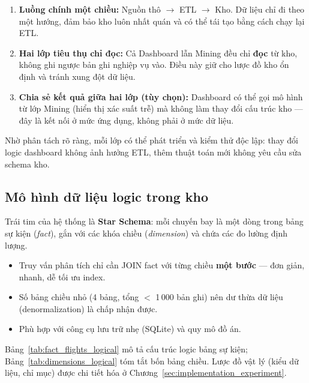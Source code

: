 \begin{enumerate}
    \item \textbf{Luồng chính một chiều:}
          Nguồn thô $\rightarrow$ ETL $\rightarrow$ Kho.
          Dữ liệu chỉ đi theo một hướng, đảm bảo kho luôn nhất quán
          và có thể tái tạo bằng cách chạy lại ETL.

    \item \textbf{Hai lớp tiêu thụ chỉ đọc:}
          Cả Dashboard lẫn Mining đều chỉ \textbf{đọc} từ kho,
          không ghi ngược bản ghi nghiệp vụ vào.
          Điều này giữ cho lược đồ kho ổn định và tránh xung đột dữ liệu.

    \item \textbf{Chia sẻ kết quả giữa hai lớp (tùy chọn):}
          Dashboard có thể gọi mô hình từ lớp Mining (hiển thị xác suất trễ)
          mà không làm thay đổi cấu trúc kho --- đây là kết nối ở mức ứng dụng,
          không phải ở mức dữ liệu.
\end{enumerate}

Nhờ phân tách rõ ràng, mỗi lớp có thể phát triển và kiểm thử độc lập:
thay đổi logic dashboard không ảnh hưởng ETL,
thêm thuật toán mới không yêu cầu sửa schema kho.

\subsection{Mô hình dữ liệu logic trong kho}

Trái tim của hệ thống là \textbf{Star Schema}:
mỗi chuyến bay là một dòng trong bảng sự kiện (\textit{fact}),
gắn với các khóa chiều (\textit{dimension}) và chứa các đo lường định lượng.

\begin{itemize}
    \item Truy vấn phân tích chỉ cần JOIN fact với từng chiều \textbf{một bước}
          --- đơn giản, nhanh, dễ tối ưu index.
    \item Số bảng chiều nhỏ (4 bảng, tổng $<$ 1\,000 bản ghi)
          nên dư thừa dữ liệu (denormalization) là chấp nhận được.
    \item Phù hợp với công cụ lưu trữ nhẹ (SQLite) và quy mô đồ án.
\end{itemize}

Bảng~\ref{tab:fact_flights_logical} mô tả cấu trúc logic bảng sự kiện;
Bảng~\ref{tab:dimensions_logical} tóm tắt bốn bảng chiều.
Lược đồ vật lý (kiểu dữ liệu, chỉ mục) được chi tiết hóa ở Chương~\ref{sec:implementation_experiment}.

